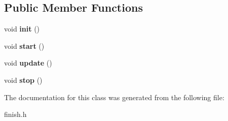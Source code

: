 \subsection*{Public Member Functions}
\begin{DoxyCompactItemize}
\item 
\mbox{\label{classFinishController_a5c2b92cc1d7f9000c36a3b28dab2dab2}} 
void {\bfseries init} ()
\item 
\mbox{\label{classFinishController_a7c92091d8eb58f50d403f127956ae339}} 
void {\bfseries start} ()
\item 
\mbox{\label{classFinishController_ace9a0d5687e3c2f8ea48dd0d9f5930da}} 
void {\bfseries update} ()
\item 
\mbox{\label{classFinishController_abffc1d3517f007806404a491cfd2cb46}} 
void {\bfseries stop} ()
\end{DoxyCompactItemize}


The documentation for this class was generated from the following file\+:\begin{DoxyCompactItemize}
\item 
finish.\+h\end{DoxyCompactItemize}
